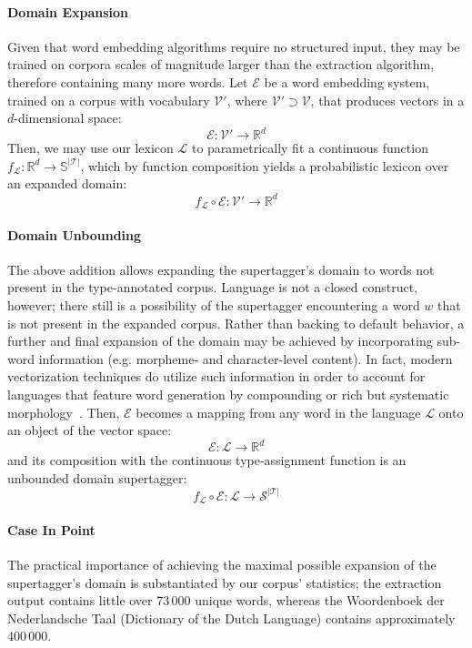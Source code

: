 \paragraph{Domain Expansion}
Given that word embedding algorithms require no structured input, they may be trained on corpora scales of magnitude larger than the extraction algorithm, therefore containing many more words.
Let $\mathcal{E}$ be a word embedding system, trained on a corpus with vocabulary $\mathcal{V}'$, where $\mathcal{V}' \supset \mathcal{V}$, that produces vectors in a $d$-dimensional space:
\[
\mathcal{E}: \mathcal{V}' \to \mathbb{R}^d
\]
Then, we may use our lexicon $\mathcal{L}$ to parametrically fit a continuous function $f_\mathcal{L}: \mathbb{R}^d \to \mathbb{S}^{|\mathcal{T}|}$, which by function composition yields a probabilistic lexicon over an expanded domain:
\[
 f_\mathcal{L} \circ \mathcal{E}: \mathcal{V}' \to \mathbb{R}^d
\]


\paragraph{Domain Unbounding}
The above addition allows expanding the supertagger's domain to words not present in the type-annotated corpus.
Language is not a closed construct, however; there still is a possibility of the supertagger encountering a word $w$ that is not present in the expanded corpus.
Rather than backing to default behavior, a further and final expansion of the domain may be achieved by incorporating sub-word information (e.g. morpheme- and character-level content).
In fact, modern vectorization techniques do utilize such information in order to account for languages that feature word generation by compounding or rich but systematic morphology~\cite{fasttext}.
Then, $\mathcal{E}$ becomes a mapping from any word in the language $\mathcal{L}$ onto an object of the vector space:
\[
\mathcal{E}: \mathcal{L} \to \mathbb{R}^d
\]
and its composition with the continuous type-assignment function is an unbounded domain supertagger:
\[
f_\mathcal{L} \circ \mathcal{E}: \mathcal{L} \to \mathcal{S}^{|\mathcal{T}|}
\]

\paragraph{Case In Point}
The practical importance of achieving the maximal possible expansion of the supertagger's domain is substantiated by our corpus' statistics; the extraction output contains little over 73\,000 unique words, whereas the Woordenboek der Nederlandsche Taal (Dictionary of the Dutch Language)\cite{woordenboek} contains approximately 400\,000.

